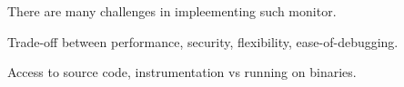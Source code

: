 There are many challenges in impleementing such monitor. 
\begin{structure}
\item Trade-off between performance, security, flexibility, ease-of-debugging.
\item Access to source code, instrumentation vs running on binaries.
\end{structure}
